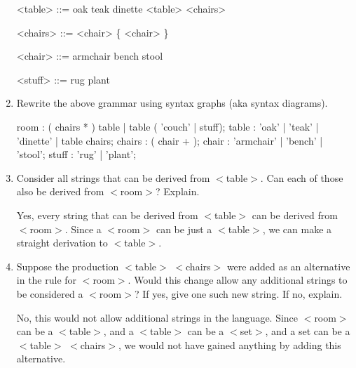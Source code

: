 \documentclass[12pt,letterpaper]{article}
\begin{document}
\begin{enumerate}
\begin{grammar}
        <table> ::= oak
                \alt teak
                \alt dinette
                \alt <table> <chairs>

        <chairs> ::= <chair> \{ <chair> \}

        <chair> ::= armchair
                \alt bench
                \alt stool

        <stuff> ::= rug
                \alt plant
      \end{grammar}

    \item Rewrite the above grammar using syntax graphs (aka syntax diagrams).
      \begin{rail}
        room : ( chairs * ) table | table ( 'couch' | stuff);
        table : 'oak' | 'teak' | 'dinette' | table chairs;
        chairs : ( chair + );
        chair : 'armchair' | 'bench' | 'stool';
        stuff : 'rug' | 'plant';
      \end{rail}

    \item
      Consider all strings that can be derived from $<$table$>$.
      Can each of those also be derived from $<$room$>$?
      Explain.

      Yes, every string that can be derived from $<$table$>$
      can be derived from $<$room$>$.
      Since a $<$room$>$ can be just a $<$table$>$,
      we can make a straight derivation to $<$table$>$.

    \item
      Suppose the production $<$table$>$ $<$chairs$>$ were added as an alternative in the rule for $<$room$>$.
      Would this change allow any additional strings to be considered a $<$room$>$?
      If yes, give one such new string.
      If no, explain.

      No, this would not allow additional strings in the language.
      Since $<$room$>$ can be a $<$table$>$, and a $<$table$>$ can be a $<$set$>$, and a set can be a $<$table$>$ $<$chairs$>$,
      we would not have gained anything by adding this alternative.
  \end{enumerate}
\end{document}
